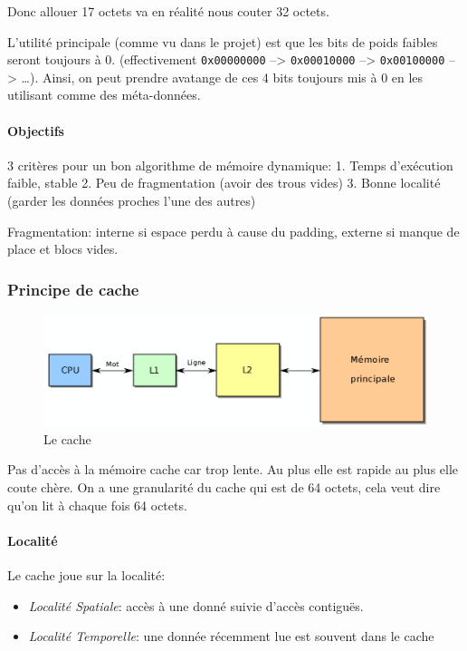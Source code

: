 Donc allouer 17 octets va en réalité nous couter 32 octets.

L'utilité principale (comme vu dans le projet) est que les bits de poids
faibles seront toujours à 0. (effectivement \texttt{0x00000000}
--\textgreater{} \texttt{0x00010000} --\textgreater{}
\texttt{0x00100000} --\textgreater{} \ldots). Ainsi, on peut prendre
avatange de ces 4 bits toujours mis à 0 en les utilisant comme des
méta-données.

\paragraph{Objectifs}\label{objectifs}

3 critères pour un bon algorithme de mémoire dynamique: 1. Temps
d'exécution faible, stable 2. Peu de fragmentation (avoir des trous
vides) 3. Bonne localité (garder les données proches l'une des autres)

Fragmentation: interne si espace perdu à cause du padding, externe si
manque de place et blocs vides.

\subsubsection{Principe de cache}\label{principe-de-cache}

\begin{figure}
\centering
\includegraphics{image-49.png}
\caption{Le cache}
\end{figure}

Pas d'accès à la mémoire cache car trop lente. Au plus elle est rapide
au plus elle coute chère. On a une granularité du cache qui est de 64
octets, cela veut dire qu'on lit à chaque fois 64 octets.

\paragraph{Localité}\label{localituxe9}

Le cache joue sur la localité:

\begin{itemize}
\tightlist
\item
  \emph{Localité Spatiale}: accès à une donné suivie d'accès contiguës.
\item
  \emph{Localité Temporelle}: une donnée récemment lue est souvent dans
  le cache
\end{itemize}

